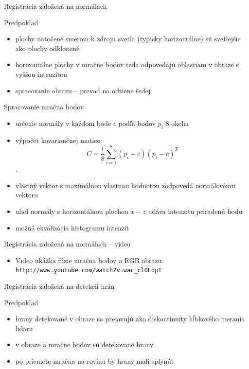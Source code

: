 \documentclass[pdf]{beamer}
\begin{document}
	\begin{frame}{Registrácia založená na normálach}
		\begin{alertblock}{Predpoklad}
			\begin{itemize}
				\item plochy natočené smerom k zdroju svetla (typicky horizontálne) sú svetlejšie ako plochy odklonené
			\end{itemize}			
		\end{alertblock}		
		\begin{itemize}
			\item horizontálne plochy v mračne bodov teda odpovedajú oblastiam v obraze s vyššou intenzitou
			\item spracovanie obrazu -- prevod na odtiene šedej
		\end{itemize}
	\end{frame}
	
	\begin{frame}{Spracovanie mračna bodov}
		\begin{itemize}
			\item určenie normály v každom bode $c$ podľa bodov $p_i$ $8$ okolia
			\item výpočet kovariančnej matice:
				\begin{equation}
					C = \frac{1}{8} \sum\limits_{i=1}^8 (p_i-c)(p_i-c)^T
				\end{equation}.
			\item vlastný vektor s maximálnou vlastnou hodnotou zodpovedá normálovému vektoru
			\item uhol normály s horizontálnou plochou $x - z$ udáva intenzitu priradenú bodu
			\item možná ekvalizácia histogramu intenzít
		\end{itemize}
	\end{frame}

	\begin{frame}{Registrácia založená na normálach -- video}
		\begin{itemize}
			\item Video ukážka fúzie mračna bodov a RGB obrazu \\
				\texttt{http://www.youtube.com/watch?v=war\_cl0LdpI}
		\end{itemize}
	\end{frame}

	\begin{frame}{Registrácia založená na detekcii hrán}
		\begin{alertblock}{Predpoklad}
			\begin{itemize}
				\item hrany detekované v obraze sa prejavujú ako diskontinuity hĺbkového merania lidaru
			\end{itemize}			
		\end{alertblock}	
		\begin{itemize}
			\item v obraze a mračne bodov sú detekované hrany
			\item po priemete mračna na rovinu by hrany mali splynúť
		\end{itemize}			
	\end{frame}
	
\end{document}
